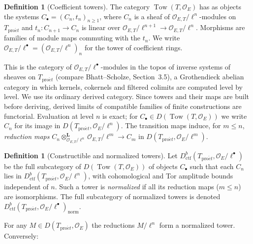 \documentclass[11pt,a4paper]{article}
\numberwithin{equation}{section}
\theoremstyle{definition}
\newtheorem{definition}[theorem]{Definition}
\theoremstyle{remark}
\newcommand{\proet}{\mathrm{pro}\acute{e}t}
\newcommand{\Dctf}{D^b_{\mathrm{ctf}}}
\begin{document}
\begin{definition}[Coefficient towers]\label{def:sp-coefficient-towers}
The category $\operatorname{Tow}(T,\mathcal O_E)$ has as objects the
systems $C_\bullet=(C_n,t_n)_{n\geq1}$, where $C_n$ is a sheaf of
$\mathcal O_{E,T}/\ell^n$-modules on $T_{\proet}$ and
$t_n:C_{n+1}\to C_n$ is linear over
$\mathcal O_{E,T}/\ell^{n+1}\to\mathcal O_{E,T}/\ell^n$. Morphisms are
families of module maps commuting with the $t_n$. We write
$\mathcal O_{E,T}/\ell^\bullet=(\mathcal O_{E,T}/\ell^n)_n$ for the
tower of coefficient rings.
\end{definition}

This is the category of $\mathcal O_{E,T}/\ell^\bullet$-modules in the
topos of inverse systems of sheaves on $T_{\proet}$ (compare
Bhatt--Scholze, Section~3.5), a Grothendieck abelian category in which
kernels, cokernels and filtered colimits are computed level by level.
We use its ordinary derived category. Since towers and their maps are
built before deriving, derived limits of compatible families of finite
constructions are functorial. Evaluation at level $n$ is exact; for
$C_\bullet\in D(\operatorname{Tow}(T,\mathcal O_E))$ we write $C_n$ for
its image in $D(T_{\proet},\mathcal O_E/\ell^n)$. The transition maps
induce, for $m\leq n$, \emph{reduction maps}
$C_n\otimes^{\mathbf L}_{\mathcal O_{E,T}/\ell^n}\mathcal O_{E,T}/\ell^m\to C_m$
in $D(T_{\proet},\mathcal O_E/\ell^m)$.

\begin{definition}[Constructible and normalized towers]
\label{def:sp-normalized-towers}
Let $\Dctf(T_{\proet},\mathcal O_E/\ell^\bullet)$ be the full
subcategory of $D(\operatorname{Tow}(T,\mathcal O_E))$ of objects
$C_\bullet$ such that each $C_n$ lies in
$\Dctf(T_{\proet},\mathcal O_E/\ell^n)$, with cohomological and Tor
amplitude bounds independent of $n$. Such a tower is
\emph{normalized} if all its reduction maps ($m\leq n$) are
isomorphisms. The full subcategory of normalized towers is denoted
$\Dctf(T_{\proet},\mathcal O_E/\ell^\bullet)_{\mathrm{norm}}$.
\end{definition}

For any $M\in D(T_{\proet},\mathcal O_E)$ the reductions $M/\ell^n$
form a normalized tower. Conversely:
\end{document}
